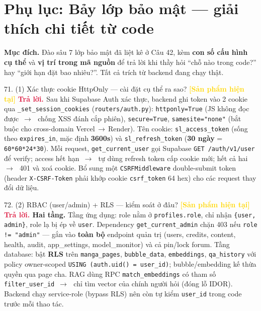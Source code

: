 \documentclass[11pt]{article}
\newcommand{\arr}{\,\ensuremath{\rightarrow}\,}
\newcommand{\tagSP}{\textcolor{gold}{\footnotesize\textbf{[Sản phẩm hiện tại]}}}
\newcommand{\A}{\textbf{\textcolor{crimson}{Trả lời. }}}
\begin{document}
\section{Phụ lục: Bảy lớp bảo mật --- giải thích chi tiết từ code}

\begin{tcolorbox}[colback=steel!8,colframe=steel,sharp corners,boxrule=0.6pt]
\small\textbf{Mục đích.} Đào sâu 7 lớp bảo mật đã liệt kê ở Câu 42, kèm \textbf{con số cấu hình cụ thể} và \textbf{vị trí trong mã nguồn} để trả lời khi thầy hỏi ``chỗ nào trong code?'' hay ``giới hạn đặt bao nhiêu?''. Tất cả trích từ backend đang chạy thật.
\end{tcolorbox}

\begin{qa}{71. (1) Xác thực cookie HttpOnly --- cài đặt cụ thể ra sao? \tagSP}
\A Sau khi Supabase Auth xác thực, backend ghi token vào 2 cookie qua \texttt{\_set\_session\_cookies} (\texttt{routers/auth.py}): \texttt{httponly=True} (JS không đọc được \arr\ chống XSS đánh cắp phiên), \texttt{secure=True}, \texttt{samesite="none"} (bắt buộc cho cross-domain Vercel\arr Render). Tên cookie: \texttt{sl\_access\_token} (sống theo \texttt{expires\_in}, mặc định \textbf{3600s}) và \texttt{sl\_refresh\_token} (\textbf{30 ngày} = \texttt{60*60*24*30}). Mỗi request, \texttt{get\_current\_user} gọi Supabase \texttt{GET /auth/v1/user} để verify; access hết hạn \arr\ tự dùng refresh token cấp cookie mới; hết cả hai \arr\ 401 và xoá cookie. Bổ sung một \texttt{CSRFMiddleware} double-submit token (header \texttt{X-CSRF-Token} phải khớp cookie \texttt{csrf\_token} 64 hex) cho các request thay đổi dữ liệu.
\end{qa}

\begin{qa}{72. (2) RBAC (user/admin) + RLS --- kiểm soát ở đâu? \tagSP}
\A \textbf{Hai tầng.} Tầng ứng dụng: role nằm ở \texttt{profiles.role}, chỉ nhận \texttt{\{user, admin\}}, role lạ bị ép về \texttt{user}. Dependency \texttt{get\_current\_admin} chặn 403 nếu \texttt{role != "admin"} --- gắn vào \textbf{toàn bộ} endpoint quản trị (users, credits, content, health, audit, app\_settings, model\_monitor) và cả pin/lock forum. Tầng database: bật \textbf{RLS} trên \texttt{manga\_pages}, \texttt{bubble\_data}, \texttt{embeddings}, \texttt{qa\_history} với policy owner-scoped \texttt{USING (auth.uid() = user\_id)}; bubble/embedding kế thừa quyền qua page cha. RAG dùng RPC \texttt{match\_embeddings} có tham số \texttt{filter\_user\_id} \arr\ chỉ tìm vector của chính người hỏi (đóng lỗ IDOR). Backend chạy service-role (bypass RLS) nên còn tự kiểm \texttt{user\_id} trong code trước mỗi thao tác.
\end{qa}
\end{document}
